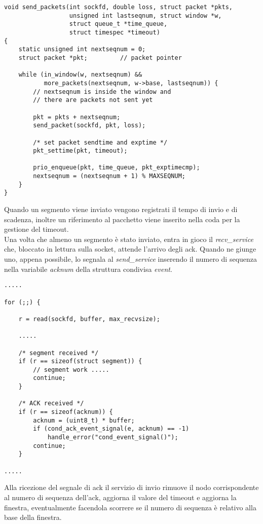 %
\begin{lstlisting}[title=transport.c]
void send_packets(int sockfd, double loss, struct packet *pkts,
                  unsigned int lastseqnum, struct window *w,
                  struct queue_t *time_queue, 
				  struct timespec *timeout)
{
    static unsigned int nextseqnum = 0;
    struct packet *pkt;         // packet pointer

    while (in_window(w, nextseqnum) &&
           more_packets(nextseqnum, w->base, lastseqnum)) {
        // nextseqnum is inside the window and
        // there are packets not sent yet

        pkt = pkts + nextseqnum;
        send_packet(sockfd, pkt, loss);

        /* set packet sendtime and exptime */
        pkt_settime(pkt, timeout);

        prio_enqueue(pkt, time_queue, pkt_exptimecmp);
        nextseqnum = (nextseqnum + 1) % MAXSEQNUM;
    }
}
\end{lstlisting}
%
Quando un segmento viene inviato vengono registrati il tempo di invio e di
scadenza, inoltre un riferimento al pacchetto viene inserito nella coda 
per la gestione del timeout.\\
Una volta che almeno un segmento è stato inviato, entra in gioco il 
\emph{recv\_service} che, bloccato in lettura sulla socket, attende l'arrivo
degli ack.
Quando ne giunge uno, appena possibile, lo segnala al \emph{send\_service} 
inserendo il numero di sequenza nella variabile \emph{acknum} della
struttura condivisa \emph{event}.
%
\begin{lstlisting}[title=transport.c]
.....

for (;;) {

	r = read(sockfd, buffer, max_recvsize);

	.....

	/* segment received */
	if (r == sizeof(struct segment)) {
		// segment work .....
		continue;
	}

	/* ACK received */
	if (r == sizeof(acknum)) {
		acknum = (uint8_t) * buffer;
		if (cond_ack_event_signal(e, acknum) == -1)
			handle_error("cond_event_signal()");
		continue;
	}

.....
\end{lstlisting}
%
Alla ricezione del segnale di ack il servizio di invio rimuove il nodo 
corrispondente al numero di sequenza dell'ack, aggiorna il valore 
del timeout e aggiorna la finestra, eventualmente facendola scorrere 
se il numero di sequenza è relativo alla base della finestra.
